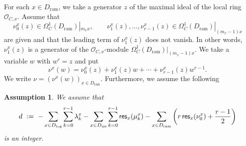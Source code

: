 \documentclass[pdftex]{sigma}
\numberwithin{equation}{section}
\newtheorem{Assumption}[Theorem]{Assumption}
\newcommand{\res}{\mathop{\sf res}\nolimits}
\begin{document}
For each $x\in D_{\mathrm{ram}}$, we take a generator
$z$ of the maximal ideal of the local ring
${\mathcal O}_{C,x}$.
Assume that
\[
 \nu^x_0(z)\in\Omega^1_C(D_{\mathrm{ram}})|_{m_xx},
 \qquad
 \nu^x_1(z),\dots,\nu^x_{r-1}(z)\in\Omega^1_C(D_{\mathrm{ram}})|_{(m_x-1)x}
\]
are given and that the leading term of $\nu_1^x(z)$ does not vanish.
In other words, $\nu_1^x(z)$ is a generator of
the ${\mathcal O}_{C,x}$-module $\Omega^1_C(D_{\mathrm{ram}})|_{(m_x-1)x}$.
We take a variable $w$ with $w^r=z$ and put
\[
 \nu^x(w)=\nu^x_0(z)+\nu^x_1(z)w+\cdots+\nu^x_{r-1}(z)w^{r-1}.
\]
We write
$\nu=(\nu^x(w))_{x\in D_{\mathrm{ram}}}$.
Furthermore, we assume the following

\begin{Assumption}\rm
We assume that
\[
 d \ := \
 -\sum_{x\in D_{\mathrm{log}}} \sum_{k=0}^{r-1} \lambda^x_k
 -\sum_{x\in D_{\mathrm{un}}} \sum_{k=0}^{r-1}\res_{x}(\mu^x_k)
 -\sum_{x\in D_{\mathrm{ram}}} \left(r\res_x(\nu^x_0)+\frac{r-1}{2}\right)
\]
is an integer.
\end{Assumption}
\end{document}
